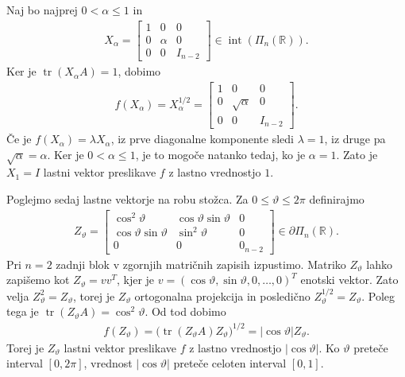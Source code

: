 \documentclass[mat2, tisk]{fmfdelo}
\newcommand{\R}{\mathbb{R}}
\begin{document}
\begin{zgled}
  Naj bo najprej $0<\alpha\leq 1$ in
  \begin{align*}
  X_\alpha
  =
  \begin{bmatrix}
  1 & 0 & 0\\
  0 & \alpha & 0\\
  0 & 0 & I_{n-2}
  \end{bmatrix}
  \in\operatorname{int}(\Pi_n(\R)).
  \end{align*}
  Ker je $\operatorname{tr}(X_\alpha A)=1$, dobimo
  \begin{align*}
  f(X_\alpha)
  =
  X_\alpha^{1/2}
  =
  \begin{bmatrix}
  1 & 0 & 0\\
  0 & \sqrt{\alpha} & 0\\
  0 & 0 & I_{n-2}
  \end{bmatrix}.
  \end{align*}
  Če je $f(X_\alpha)=\lambda X_\alpha$, iz prve diagonalne komponente sledi
  $\lambda=1$, iz druge pa $\sqrt{\alpha}=\alpha$. Ker je $0<\alpha\leq1$,
  je to mogoče natanko tedaj, ko je $\alpha=1$. Zato je
  $X_1=I$ lastni vektor preslikave $f$ z lastno vrednostjo $1$.

  Poglejmo sedaj lastne vektorje na robu stožca. Za
  $0\leq\vartheta\leq2\pi$ definirajmo
  \begin{align*}
  Z_\vartheta
  =
  \begin{bmatrix}
  \cos^2\vartheta &
  \cos\vartheta\sin\vartheta & 0\\
  \cos\vartheta\sin\vartheta &
  \sin^2\vartheta & 0\\
  0 & 0 & 0_{n-2}
  \end{bmatrix}
  \in\partial\Pi_n(\R).
  \end{align*}
  Pri $n=2$ zadnji blok v zgornjih matričnih zapisih izpustimo.
  Matriko $Z_\vartheta$ lahko zapišemo kot $Z_\vartheta=vv^T$, kjer je
  $v=(\cos\vartheta,\sin\vartheta,0,\ldots,0)^T$ enotski vektor. Zato velja
  $Z_\vartheta^2=Z_\vartheta$, torej je $Z_\vartheta$ ortogonalna projekcija in
  posledično $Z_\vartheta^{1/2}=Z_\vartheta$.
  Poleg tega je
  $\operatorname{tr}(Z_\vartheta A)=\cos^2\vartheta$. Od tod dobimo
  \begin{align*}
  f(Z_\vartheta)=
  \bigl(\operatorname{tr}(Z_\vartheta A)Z_\vartheta\bigr)^{1/2}=
  |\cos\vartheta|Z_\vartheta.
  \end{align*}
  Torej je $Z_\vartheta$ lastni vektor preslikave $f$ z lastno vrednostjo
  $|\cos\vartheta|$. Ko $\vartheta$ preteče interval $[0,2\pi]$, vrednost
  $|\cos\vartheta|$ preteče celoten interval $[0,1]$.


\end{zgled}
\end{document}
